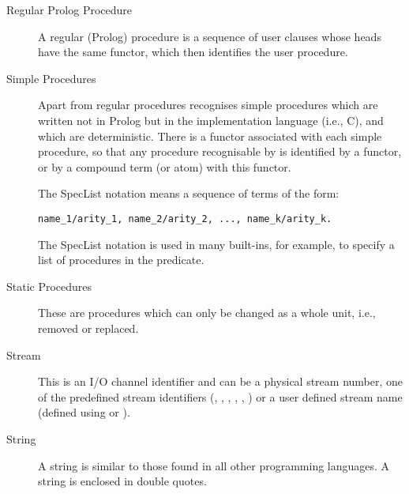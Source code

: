 \begin{description}
\item[Regular Prolog Procedure%
]

A regular (Prolog) procedure is a sequence of user clauses whose heads
have the same functor, which then identifies the user procedure.


\item[Simple Procedures]
Apart from regular procedures {\eclipse} recognises simple procedures
which are written not in Prolog but in the implementation language (i.e., C),
and which are deterministic.
There is a functor associated with each
simple procedure, so that
any procedure recognisable by {\eclipse} is identified by a functor,
or by a compound term (or atom) with this functor.

\item[]
The SpecList notation means a sequence of  terms of the form:
\begin{verbatim}
name_1/arity_1, name_2/arity_2, ..., name_k/arity_k.
\end{verbatim}
The SpecList notation is used in many built-ins, for example,
to specify a list of procedures in the
 predicate.

\item[Static Procedures]
These are procedures which can only be changed as a whole unit, i.e., removed or
replaced.

\item[Stream]
This is an I/O channel identifier and can be a physical stream number, one of
the predefined stream identifiers (, ,
, , ,
)
or a user defined stream name (defined using
 or
 ).

\item[String]
A string is similar to those found in all other programming languages.  A string
is enclosed in double quotes.


\end{description}
